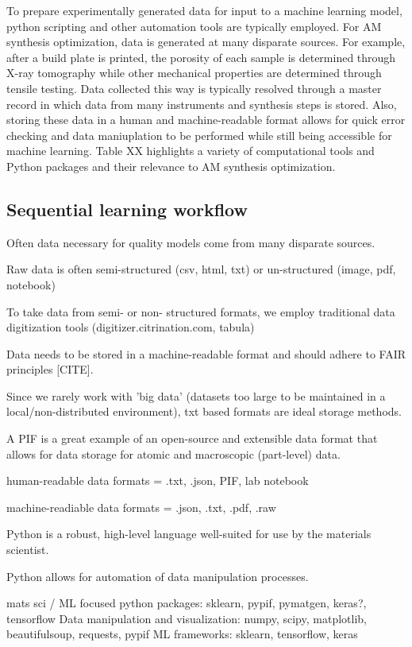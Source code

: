 To prepare experimentally generated data for input to a machine learning model, python scripting and other automation tools are typically employed.
For AM synthesis optimization, data is generated at many disparate sources.
For example, after a build plate is printed, the porosity of each sample is determined through X-ray tomography while other mechanical properties are determined through tensile testing.
Data collected this way is typically resolved through a master record in which data from many instruments and synthesis steps is stored.
Also, storing these data in a human and machine-readable format allows for quick error checking and data maniuplation to be performed while still being accessible for machine learning.
Table XX highlights a variety of computational tools and Python packages and their relevance to AM synthesis optimization.



\subsection{Sequential learning workflow}




Often data necessary for quality models come from many disparate sources.

Raw data is often semi-structured (csv, html, txt) or un-structured (image, pdf, notebook)

To take data from semi- or non- structured formats, we employ traditional data digitization tools (digitizer.citrination.com, tabula)

Data needs to be stored in a machine-readable format and should adhere to FAIR principles [CITE].

Since we rarely work with 'big data' (datasets too large to be maintained in a local/non-distributed environment), txt based formats are ideal storage methods.

A PIF is a great example of an open-source and extensible data format that allows for data storage for atomic and macroscopic (part-level) data.

human-readable data formats = .txt, .json, PIF, lab notebook

machine-readiable data formats = .json, .txt, .pdf, .raw

Python is a robust, high-level language well-suited for use by the materials scientist.

Python allows for automation of data manipulation processes.

mats sci / ML focused python packages: sklearn, pypif, pymatgen, keras?, tensorflow
Data manipulation and visualization: numpy, scipy, matplotlib, beautifulsoup, requests, pypif
ML frameworks: sklearn, tensorflow, keras
